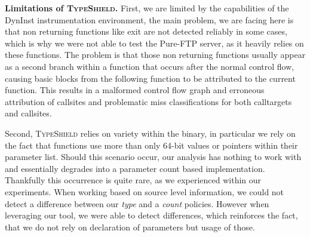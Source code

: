\textbf{Limitations of \textsc{TypeShield}.}
\label{section:limit}
First, we are limited by the capabilities of the DynInst instrumentation environment, the main problem,
we are facing here is that non returning functions like exit are not detected reliably in some cases, which is
why we were not able to test the Pure-FTP server, as it heavily relies on these functions. The problem is that
those non returning functions usually appear as a second branch within a function that occurs after the normal
control flow, causing basic blocks from the following function to be attributed to the current function. This
results in a malformed control flow graph and erroneous attribution of callsites and problematic miss classifications
for both calltargets and callsites.

Second, \textsc{TypeShield} relies on variety within the binary, in particular we rely on
the fact that functions use more than only 64-bit values or pointers within their parameter list. Should this
scenario occur, our analysis has nothing to work with and essentially degrades into a parameter count based
implementation. Thankfully this occurrence is quite rare, as we experienced within our experiments. When working
based on source level information, we could not detect a difference between our \textit{type} and a \textit{count} policies. 
However when leveraging our tool, we were able to detect differences, which reinforces the fact, that we do 
not rely on declaration of parameters but usage of those.
